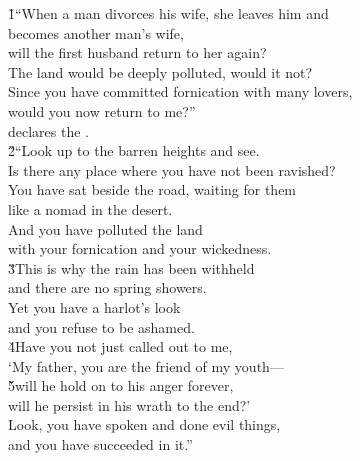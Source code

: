 \begin{poetry}
\poeml {}
\v{1}``When a man divorces his wife, she leaves him and \\
\poeml becomes another man's wife, \\
\poeml will the first husband return to her again? \\
\poemlll       The land would be deeply polluted, would it not? \\
\poeml Since you have committed fornication with many lovers, \\
\poemll    would you now return to me?'' \\
\poemlll       declares the . \\
\poeml \v{2}``Look up to the barren heights and see. \\
\poemll    Is there any place where you have not been ravished? \\
\poeml You have sat beside the road, waiting for them \\
\poemll    like a nomad in the desert. \\
\poeml And you have polluted the land \\
\poemll    with your fornication and your wickedness. \\
\poeml \v{3}This is why the rain has been withheld \\
\poemll    and there are no spring showers. \\
\poeml Yet you have a harlot's look \\
\poemll    and you refuse to be ashamed. \\
\poeml \v{4}Have you not just called out to me, \\
\poemll    `My father, you are the friend of my youth--- \\
\poeml \v{5}will he hold on to his anger forever, \\
\poemll    will he persist in his wrath to the end?' \\
\poeml Look, you have spoken and done evil things, \\
\poemll    and you have succeeded in it.''
\end{poetry}

